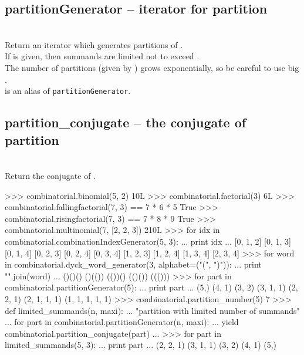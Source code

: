   \subsection{partitionGenerator -- iterator for partition}
   \\
   \spacing
   \quad Return an iterator which generates partitions of .\\
   \spacing
   \quad If  is given, then summands are limited not to exceed .\\
   \quad The number of partitions (given by
   ) grows exponentially,
   so be careful to use big .\\
   \spacing 
   is an alias of {\tt partitionGenerator}.\\

  \subsection{partition\_conjugate -- the conjugate of partition}
   \\
   \spacing
   \quad Return the conjugate of .\\

\begin{ex}
>>> combinatorial.binomial(5, 2)
10L
>>> combinatorial.factorial(3)
6L
>>> combinatorial.fallingfactorial(7, 3) == 7 * 6 * 5
True
>>> combinatorial.risingfactorial(7, 3) == 7 * 8 * 9
True
>>> combinatorial.multinomial(7, [2, 2, 3])
210L
>>> for idx in combinatorial.combinationIndexGenerator(5, 3):
...     print idx
...
[0, 1, 2]
[0, 1, 3]
[0, 1, 4]
[0, 2, 3]
[0, 2, 4]
[0, 3, 4]
[1, 2, 3]
[1, 2, 4]
[1, 3, 4]
[2, 3, 4]
>>> for word in combinatorial.dyck_word_generator(3, alphabet=("(", ")")):
...     print "".join(word)
... 
()()()
()(())
(())()
(()())
((()))
>>> for part in combinatorial.partitionGenerator(5):
...     print part
...
(5,)
(4, 1)
(3, 2)
(3, 1, 1)
(2, 2, 1)
(2, 1, 1, 1)
(1, 1, 1, 1, 1)
>>> combinatorial.partition_number(5)
7
>>> def limited_summands(n, maxi):
...     "partition with limited number of summands"
...     for part in combinatorial.partitionGenerator(n, maxi):
...         yield combinatorial.partition_conjugate(part)
...
>>> for part in limited_summands(5, 3):
...     print part
...
(2, 2, 1)
(3, 1, 1)
(3, 2)
(4, 1)
(5,)
\end{ex}%

\C



